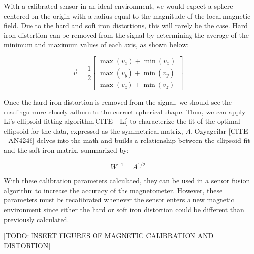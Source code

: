 With a calibrated sensor in an ideal environment, we would expect a sphere centered on the origin with a radius equal to the magnitude of the local magnetic field. 
Due to the hard and soft iron distortions, this will rarely be the case. 
Hard iron distortion can be removed from the signal by determining the average of the minimum and maximum values of each axis, as shown below:

\begin{equation*}
    \vec{v}=\frac{1}{2}
    \begin{bmatrix}
        \max(v_x)+\min(v_x) \\
        \max(v_y)+\min(v_y) \\
        \max(v_z)+\min(v_z)
    \end{bmatrix}
\end{equation*}

Once the hard iron distortion is removed from the signal, we should see the readings more closely adhere to the correct spherical shape. 
Then, we can apply Li’s ellipsoid fitting algorithm[CITE - Li] to characterize the fit of the optimal ellipsoid for the data, expressed as the symmetrical matrix, $A$. 
Ozyagcilar [CITE - AN4246] delves into the math and builds a relationship between the ellipsoid fit and the soft iron matrix, summarized by:

\begin{equation*}
    W^{-1}=A^{1/2}
\end{equation*}

With these calibration parameters calculated, they can be used in a sensor fusion algorithm to increase the accuracy of the magnetometer. 
However, these parameters must be recalibrated whenever the sensor enters a new magnetic environment since either the hard or soft iron distortion could be different than previously calculated.

[TODO: INSERT FIGURES OF MAGNETIC CALIBRATION AND DISTORTION]